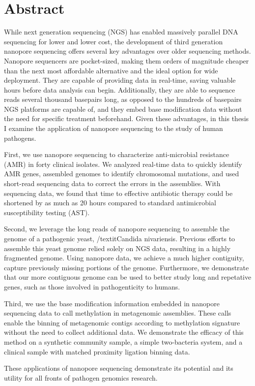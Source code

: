 \chapter*{Abstract}
\label{chap:abstract}

While next generation sequencing (NGS) has enabled massively parallel DNA sequencing for lower and lower cost, the development of third generation nanopore sequencing offers several key advantages over older sequencing methods. Nanopore sequencers are pocket-sized, making them orders of magnitude cheaper than the next most affordable alternative and the ideal option for wide deployment. They are capable of providing data in real-time, saving valuable hours before data analysis can begin. Additionally, they are able to sequence reads several thousand basepairs long, as opposed to the hundreds of basepairs NGS platforms are capable of, and they embed base modification data without the need for specific treatment beforehand. Given these advantages, in this thesis I examine the application of nanopore sequencing to the study of human pathogens.

First, we use nanopore sequencing to characterize anti-microbial resistance (AMR) in forty clinical isolates. We analyzed real-time data to quickly identify AMR genes, assembled genomes to identify chromosomal mutations, and used short-read sequencing data to correct the errors in the assemblies. With sequencing data, we found that time to effective antibiotic therapy could be shortened by as much as 20 hours compared to standard antimicrobial susceptibility testing (AST).

Second, we leverage the long reads of nanopore sequencing to assemble the genome of a pathogenic yeast, /textit{Candida nivariensis}. Previous efforts to assemble this yeast genome relied solely on NGS data, resulting in a highly fragmented genome. Using nanopore data, we achieve a much higher contiguity, capture previously missing portions of the genome. Furthermore, we demonstrate that our more contiguous genome can be used to better study long and repetative genes, such as those involved in pathogenticity to humans.

Third, we use the base modification information embedded in nanopore sequencing data to call methylation in metagenomic assemblies. These calls enable the binning of metagenomic contigs according to methylation signature without the need to collect additional data. We demonstrate the efficacy of this method on a synthetic community sample, a simple two-bacteria system, and a clinical sample with matched proximity ligation binning data.

These applications of nanopore sequencing demonstrate its potential and its utility for all fronts of pathogen genomics research.
